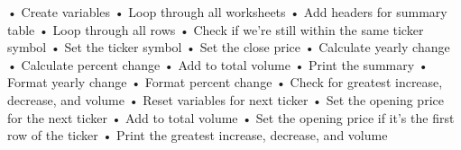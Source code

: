 •	Create variables     
•	Loop through all worksheets        
•	 Add headers for summary table
•	 Loop through all rows
•	Check if we're still within the same ticker symbol
•	Set the ticker symbol
•	Set the close price
•	 Calculate yearly change
•	 Calculate percent change
•	 Add to total volume
•	 Print the summary
•	 Format yearly change
•	Format percent change
•	 Check for greatest increase, decrease, and volume
•	 Reset variables for next ticker
•	 Set the opening price for the next ticker
•	 Add to total volume
•	 Set the opening price if it's the first row of the ticker
•	 Print the greatest increase, decrease, and volume

